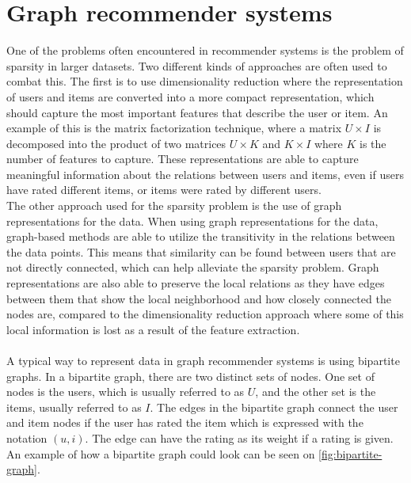 \section{Graph recommender systems}\label{sec:graph-rec-sys}
One of the problems often encountered in recommender systems is the problem of sparsity in larger datasets.
Two different kinds of approaches are often used to combat this. 
The first is to use dimensionality reduction where the representation of users and items are converted into a more compact representation, which should capture the most important features that describe the user or item.
An example of this is the matrix factorization technique, where a matrix $U \times I$ is decomposed into the product of two matrices $U \times K $ and $ K \times I$ where $K$ is the number of features to capture.
These representations are able to capture meaningful information about the relations between users and items, even if users have rated different items, or items were rated by different users. 
\\
The other approach used for the sparsity problem is the use of graph representations for the data.
When using graph representations for the data, graph-based methods are able to utilize the transitivity in the relations between the data points. 
This means that similarity can be found between users that are not directly connected, which can help alleviate the sparsity problem.
Graph representations are also able to preserve the local relations as they have edges between them that show the local neighborhood and how closely connected the nodes are, compared to the dimensionality reduction approach where some of this local information is lost as a result of the feature extraction\cite{RecommenderHandbook2015}.
\\\\
A typical way to represent data in graph recommender systems is using bipartite graphs.
In a bipartite graph, there are two distinct sets of nodes.
One set of nodes is the users, which is usually referred to as $U$, and the other set is the items, usually referred to as $I$.
The edges in the bipartite graph connect the user and item nodes if the user has rated the item which is expressed with the notation $(u, i)$. 
The edge can have the rating as its weight if a rating is given.
An example of how a bipartite graph could look can be seen on \autoref{fig:bipartite-graph}.
\\\\
